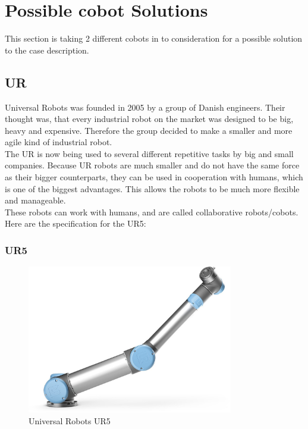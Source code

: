 
\section{Possible cobot Solutions} \label{ch:UR}

This section is taking 2 different cobots in to consideration for a possible solution to the case description.

\subsection{UR}

Universal Robots was founded in 2005 by a group of Danish engineers. Their thought was, that every industrial robot on the market was designed to be big, heavy and expensive. Therefore the group decided to make a smaller and more agile kind of industrial robot.\cite{Urhist}\\


The UR is now being used to several different repetitive tasks by big and small companies.
Because UR robots are much smaller and do not have the same force as their bigger counterparts, they can be used in cooperation with humans, which is one of the biggest advantages. This allows the robots to be much more flexible and manageable.\\



These robots can work with humans, and are called collaborative robots/cobots.\\
Here are the specification for the UR5:\\ 

\subsubsection{UR5}

\begin{figure}[h]
    \centering
    \includegraphics[width=9cm]{UR/UR5pic.jpg}
    \caption{Universal Robots UR5 \cite{UR5billede}}
    \label{fig:UR5}
\end{figure}

